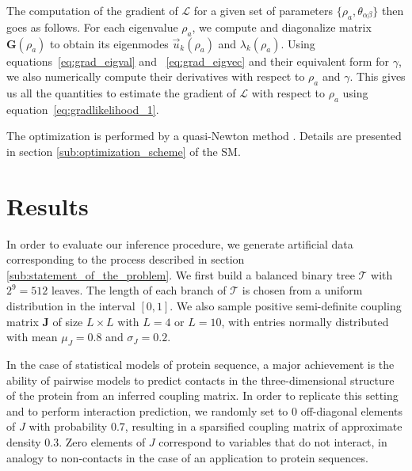 \documentclass[preprint,amsmath,amssymb,superscriptaddress,showpacs,pre]{revtex4-1}
\begin{document}
The computation of the gradient of $\mathcal{L}$ for a given set of parameters $\{\rho_a, \theta_{\alpha\beta}\}$ then goes as follows. 
For each eigenvalue $\rho_a$, we compute and diagonalize matrix $\bm{G}(\rho_a)$ to obtain its eigenmodes $\vec{u}_k(\rho_a)$ and $\lambda_k(\rho_a)$. 
Using equations~\eqref{eq:grad_eigval} and ~\eqref{eq:grad_eigvec} and their equivalent form for $\gamma$, we also numerically compute their derivatives with respect to $\rho_a$ and $\gamma$. 
This gives us all the quantities to estimate the gradient of $\mathcal{L}$ with respect to $\rho_a$ using equation~\eqref{eq:gradlikelihood_1}.

 The optimization is performed by a quasi-Newton method \cite{NLopt}. Details are presented in section \ref{sub:optimization_scheme} of the SM. 




\section{Results}
\label{sec:Results}

In order to evaluate our inference procedure, we generate artificial data corresponding to the process described in section \ref{sub:statement_of_the_problem}. 
We first build a  balanced binary tree $\mathcal{T}$ with $2^9=512$ leaves. 
The length of each branch of $\mathcal{T}$ is chosen from a uniform distribution in the interval $[0,1]$. 
We also sample positive semi-definite coupling matrix $\bm{J}$ of size $L\times L$ with $L=4$ or $L=10$, with entries normally distributed with mean $\mu_J=0.8$ and $\sigma_J=0.2$. 

In the case of statistical models of protein sequence, a major achievement is the ability of pairwise models to predict contacts in the three-dimensional structure of the protein from an inferred coupling matrix.
In order to replicate this setting and to perform interaction prediction, we randomly set to $0$ off-diagonal elements of $J$ with probability $0.7$, resulting in a sparsified coupling matrix of approximate density $0.3$.  
Zero elements of $J$ correspond to variables that do not interact, in analogy to non-contacts in the case of an application to protein sequences.  
\end{document}
